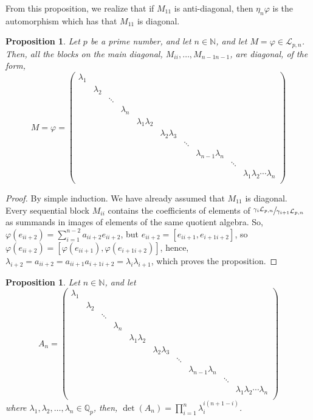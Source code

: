 \documentclass[12pt]{article}
\newtheorem{proposition}[theorem]{Proposition}
\begin{document}
From this proposition, we realize that if $M_{11}$ is anti-diagonal, then $\eta_n\varphi$ is the automorphism which has that $M_{11}$ is diagonal.
\begin{proposition}
\label{prop.main.diagonal.blocks}
Let $p$ be a prime number, and let $n\in\mathbb{N}$, and let $M=\varphi\in\mathcal{L}_{p,n}$. Then, all the blocks on the main diagonal, $M_{ii},\dots,M_{n-1n-1}$, are diagonal, of the form,$$
M=\varphi=\begin{pmatrix}
\lambda_1 & & & & & & & &\\
& \lambda_2 & & & & & & &\\
& & \ddots & & & & & &\\
& & & \lambda_n & & & & &\\
& & & & \lambda_1\lambda_2 & & & &\\
& & & & & \lambda_2\lambda_3 & & &\\
& & & & & & \ddots & &\\
& & & & & & & \lambda_{n-1}\lambda_n & &\\
& & & & & & & & \ddots &\\
& & & & & & & & & \lambda_1\lambda_2\cdots\lambda_n\\
\end{pmatrix}
$$
\end{proposition}
\begin{proof}
By simple induction. We have already assumed that $M_{11}$ is diagonal. Every sequential block $M_{ii}$ contains the coefficients of elements of $\sfrac{\gamma_i\mathcal{L}_{p,n}}{\gamma_{i+1}\mathcal{L}_{p,n}}$ as summands in images of elements of the same quotient algebra. So, $\varphi(e_{ii+2})=\sum_{i=1}^{n-2}a_{ii+2}e_{ii+2}$, but $e_{ii+2}=[e_{ii+1},e_{i+1i+2}]$, so $\varphi(e_{ii+2})=[\varphi(e_{ii+1}),\varphi(e_{i+1i+2})]$, hence, $\lambda_{i+2}=a_{ii+2}=a_{ii+1}a_{i+1i+2}=\lambda_{i}\lambda_{i+1}$, which proves the proposition.
\end{proof}
\begin{proposition}
\label{prop.h.matrix.determinant}
Let $n\in\mathbb{N}$, and let $$
A_n=\begin{pmatrix}
\lambda_1 & & & & & & & &\\
& \lambda_2 & & & & & & &\\
& & \ddots & & & & & &\\
& & & \lambda_n & & & & &\\
& & & & \lambda_1\lambda_2 & & & &\\
& & & & & \lambda_2\lambda_3 & & &\\
& & & & & & \ddots & &\\
& & & & & & & \lambda_{n-1}\lambda_n & &\\
& & & & & & & & \ddots &\\
& & & & & & & & & \lambda_1\lambda_2\cdots\lambda_n\\
\end{pmatrix}
$$
where $\lambda_1,\lambda_2,\dots,\lambda_n\in\mathbb{Q}_p$, then, $\det(A_n)=\prod_{i=1}^{n}\lambda_i^{i(n+1-i)}$.
\end{proposition}
\end{document}
